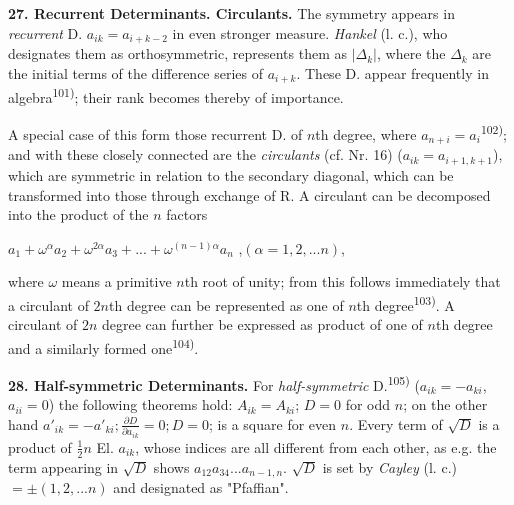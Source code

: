 \thispagestyle{fancy}

\vspace{0.5cm}

\textbf{27. Recurrent Determinants. Circulants.} The symmetry appears in \textit{recurrent} D. $a_{ik}=a_{i+k-2}$ in even stronger measure. \textit{Hankel} (l. c.), who designates them as orthosymmetric, represents them as $|\Delta_k|$, where the $\Delta_k$ are the initial terms of the difference series of $a_{i+k}$. These D. appear frequently in algebra\textsuperscript{101)}; their rank becomes thereby of importance.

A special case of this form those recurrent D. of $n$th degree, where $a_{n+i}=a_i$\textsuperscript{102)}; and with these closely connected are the \textit{circulants} (cf. Nr. 16) ($a_{ik}=a_{i+1,k+1}$), which are symmetric in relation to the secondary diagonal, which can be transformed into those through exchange of R. A circulant can be decomposed into the product of the $n$ factors 

\vspace{-0.1cm}
\begin{center}
    $ a_1 + \omega^\alpha a_2 + \omega^{2\alpha} a_3 + ... + \omega^{(n-1)\alpha} a_n$ ,\quad $(\alpha=1,2,...n)$, 
\end{center}
\vspace{-0.1cm}
    
where $\omega$ means a primitive $n$th root of unity; from this follows immediately that a circulant of $2n$th degree can be represented as one of $n$th degree\textsuperscript{103)}. A circulant of $2n$ degree can further be expressed as product of one of $n$th degree and a similarly formed one\textsuperscript{104)}.

\vspace{0.2cm}

\textbf{28. Half-symmetric Determinants.} For \textit{half-symmetric} D.\textsuperscript{105)} ($a_{ik}=-a_{ki}$, $a_{ii}=0$) the following theorems hold: $A_{ik}=A_{ki}$; $D=0$ for odd $n$; on the other hand $a'_{ik}=-a'_{ki}; \frac{\partial D}{\partial a_{ik}}=0; D=0$; is a square for even $n$. Every term of $\sqrt{D}$ is a product of $\frac{1}{2}n$ El. $a_{ik}$, whose indices are all different from each other, as e.g. the term appearing in $\sqrt{D}$ shows $a_{12} a_{34} ... a_{n-1,n}$. $\sqrt{D}$ is set by \textit{Cayley} (l. c.) $=\pm(1,2,...n)$ and designated as "Pfaffian".

